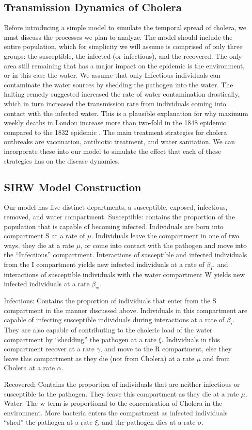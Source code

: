 \documentclass[12pt]{article}\usepackage[]{graphicx}\usepackage[]{color}
\begin{document}
\subsection{Transmission Dynamics of Cholera}
Before introducing a simple model to simulate the temporal spread of cholera, we must discuss the processes we plan to analyze.
The model should include the entire population, which for simplicity we will assume is comprised of only three groups: the susceptible, the infected (or infectious), and the recovered.
The only area still remaining that has a major impact on the epidemic is the environment, or in this case the water.
We assume that only Infectious individuals can contaminate the water sources by shedding the pathogen into the water.
The halting remedy suggested increased the rate of water contamination drastically, which in turn increased the transmission rate from individuals coming into contact with the infected water.
This is a plausible explanation for why maximum weekly deaths in London increase more than two-fold in the 1848 epidemic compared to the 1832 epidemic \citep{link3}.
The main treatment strategies for cholera outbreaks are vaccination, antibiotic treatment, and water sanitation.
We can incorporate these into our model to simulate the effect that each of these strategies has on the disease dynamics.
\subsection{SIRW Model Construction}
Our model has five distinct departments, a susceptible, exposed, infectious, removed, and water compartment.
Susceptible: contains the proportion of the population that is capable of becoming infected.
Individuals are born into compartment S at a rate of $\mu$.
Individuals leave the compartment in one of two ways, they die at a rate $\mu$, or come into contact with the pathogen and move into the “Infectious” compartment.
Interactions of susceptible and infected individuals from the I compartment yields new infected individuals at a rate of $\beta_I$, and interactions of susceptible individuals with the water compartment W yields new infected individuals at a rate $\beta_w$.\par
Infectious: Contains the proportion of individuals that enter from the S compartment in the manner discussed above.
Individuals in this compartment are capable of infecting susceptible individuals during interactions at a rate of $\beta_i$.
They are also capable of contributing to the choleric load of the water compartment by “shedding” the pathogen at a rate $\xi$.
Individuals in this compartment recover at a rate $\gamma$, and move to the R compartment, else they leave this compartment as they die (not from Cholera) at a rate $\mu$ and from Cholera at a rate $\alpha$.\par
Recovered: Contains the proportion of individuals that are neither infectious or susceptible to the pathogen.
They leave this compartment as they die at a rate $\mu$.
Water: The w term is proportional to the concentration of Cholera in the environment.
More bacteria enters the compartment as infected individuals “shed” the pathogen at a rate $\xi$, and the pathogen dies at a rate $\sigma$.
\end{document}
